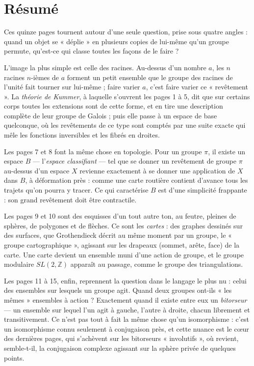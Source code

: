 \documentclass[11pt,a4paper]{article}
\begin{document}
\section*{Résumé}

\begin{resume}
Ces quinze pages tournent autour d'une seule question, prise sous quatre
angles : quand un objet se « déplie » en plusieurs copies de lui-même qu'un
groupe permute, qu'est-ce qui classe toutes les façons de le faire ?

L'image la plus simple est celle des racines. Au-dessus d'un nombre $a$, les
$n$ racines $n$-ièmes de $a$ forment un petit ensemble que le groupe des
racines de l'unité fait tourner sur lui-même ; faire varier $a$, c'est faire
varier ce « revêtement ». La \emph{théorie de Kummer}, à laquelle s'ouvrent les
pages 1 à 5, dit que sur certains corps toutes les extensions sont de cette
forme, et en tire une description complète de leur groupe de Galois ; puis
elle passe à un espace de base quelconque, où les revêtements de ce type sont
comptés par une suite exacte qui mêle les fonctions inversibles et les fibrés
en droites.

Les pages 7 et 8 font la même chose en topologie. Pour un groupe $\pi$, il
existe un espace $B$ — l'\emph{espace classifiant} — tel que se donner un
revêtement de groupe $\pi$ au-dessus d'un espace $X$ revienne exactement à se
donner une application de $X$ dans $B$, à déformation près : comme une carte
routière contient d'avance tous les trajets qu'on pourra y tracer. Ce qui
caractérise $B$ est d'une simplicité frappante : son grand revêtement doit être
contractile.

Les pages 9 et 10 sont des esquisses d'un tout autre ton, au feutre, pleines de
sphères, de polygones et de flèches. Ce sont les \emph{cartes} : des graphes
dessinés sur des surfaces, que Grothendieck décrit au même moment par un
groupe, le « groupe cartographique », agissant sur les drapeaux (sommet, arête,
face) de la carte. Une carte devient un ensemble muni d'une action de groupe, et
le groupe modulaire $SL(2, \mathbb{Z})$ apparaît au passage, comme le groupe
des triangulations.

Les pages 11 à 15, enfin, reprennent la question dans le langage le plus nu :
celui des ensembles sur lesquels un groupe agit. Quand deux groupes ont-ils
« les mêmes » ensembles à action ? Exactement quand il existe entre eux un
\emph{bitorseur} — un ensemble sur lequel l'un agit à gauche, l'autre à droite,
chacun librement et transitivement. Ce n'est pas tout à fait la même chose
qu'un isomorphisme : c'est un isomorphisme connu seulement à conjugaison près,
et cette nuance est le cœur des dernières pages, qui s'achèvent sur les
bitorseurs « involutifs », où revient, semble-t-il, la conjugaison complexe
agissant sur la sphère privée de quelques points.


\end{resume}
\end{document}

